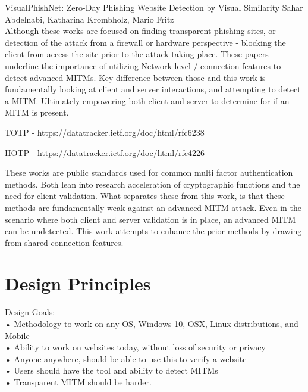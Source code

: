 \documentclass[a4paper, 11pt]{article} 				%
\begin{document}
\noindent
[19]VisualPhishNet: Zero-Day Phishing Website Detection by Visual Similarity
Sahar Abdelnabi, Katharina Krombholz, Mario Fritz\\

Although these works are focused on finding transparent phishing sites, or detection of the attack from a firewall or hardware perspective - blocking the client from access the site prior to the attack taking place. These papers underline the importance of utilizing Network-level / connection features to detect advanced MITMs. Key difference between those and this work is fundamentally looking at client and server interactions, and attempting to detect a MITM. Ultimately empowering both client and server to determine for if an MITM is present. 

\noindent
[7]TOTP - https://datatracker.ietf.org/doc/html/rfc6238

\noindent
[8]HOTP - https://datatracker.ietf.org/doc/html/rfc4226 

These works are public standards used for common multi factor authentication methods. Both lean into research acceleration of cryptographic functions and the need for client validation. What separates these from this work, is that these methods are fundamentally weak against an advanced MITM attack. Even in the scenario where both client and server validation is in place, an advanced MITM can be undetected. This work attempts to enhance the prior methods by drawing from shared connection features.

\section{Design Principles}
\noindent	%
Design Goals:\\
• Methodology to work on any OS, Windows 10, OSX, Linux distributions, and Mobile\\
• Ability to work on websites today, without loss of security or privacy\\
• Anyone anywhere, should be able to use this to verify a website\\
• Users should have the tool and ability to detect MITMs\\
• Transparent MITM should be harder.\\
\end{document}
